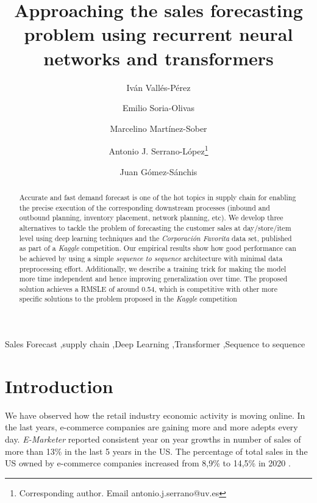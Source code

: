 \documentclass{elsarticle}
\begin{document}
	
	\begin{frontmatter}

		\title{Approaching the sales forecasting problem using recurrent neural networks and transformers}
		
		\author[UV]{Iván Vallés-Pérez}
		\author[UV]{Emilio Soria-Olivas}
		\author[UV]{Marcelino Martínez-Sober}
		\author[UV]{Antonio J. Serrano-López\footnote{Corresponding author. Email antonio.j.serrano@uv.es}}
		\author[UV]{Juan Gómez-Sánchis}

		
		\address[UV]{Escola Tècnica Superior d\textsc{}Enginyeria, University of Valencia, Avenida de la Universitat s/n 46100 Burjassot, Valencia, Spain}
		\begin{abstract}
			Accurate and fast demand forecast is one of the hot topics in supply chain for enabling the precise execution of the corresponding downstream processes (inbound and outbound planning, inventory placement, network planning, etc). We develop three alternatives to tackle the problem of forecasting the customer sales at day/store/item level using deep learning techniques and the \textit{Corporación Favorita} data set, published as part of a \textit{Kaggle} competition. Our empirical results show how good performance can be achieved by using a simple \textit{sequence to sequence} architecture with minimal data preprocessing effort. Additionally, we describe a training trick for making the model more time independent and hence improving generalization over time. The proposed solution achieves a RMSLE of around 0.54, which is competitive with other more specific solutions to the problem proposed in the \textit{Kaggle} competition
		\end{abstract}
		
		\begin{keyword}
			Sales Forecast \sep supply chain \sep Deep Learning \sep Transformer \sep Sequence to sequence
		\end{keyword}
		
	\end{frontmatter}
	
	\linenumbers
	
	\section{Introduction}
	We have observed how the retail industry economic activity is moving online. In the last years, e-commerce companies are gaining more and more adepts every day. \textit{E-Marketer} \cite{emarketer2019, emarketer2020} reported consistent year on year growths in number of sales of more than 13\% in the last 5 years in the US. The percentage of total sales in the US owned by e-commerce companies increased from 8,9\% to 14,5\% in 2020 \cite{emarketer2019, emarketer2020}.
	
\end{document}
